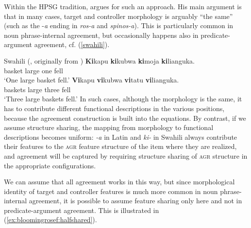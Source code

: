 \documentclass[output=paper,hidelinks]{langscibook}
\begin{document}
Within the HPSG tradition, \textcite{Kathol:Agreement} argues for such
an approach. His main argument is that in many cases, target and
controller morphology is arguably ``the same'' (such as the
-\textit{a} ending in \textit{ros-a} and \textit{spinos-a}). This is
particularly common in noun phrase-internal agreement, but
occasionally happens also in predicate-argument agreement, cf. (\ref{swahili}).

\ea\label{swahili}Swahili (\citealt[ex. 14]{Kathol:Agreement}, originally from \citealt[171]{Welmers1973})
\ea\label{swahili1}
\gll\textbf{Ki}kapu \textbf{ki}kubwa \textbf{ki}moja \textbf{ki}lianguka.\\
basket large one fell\\
\glt`One large basket fell.'
\ex\label{swahili2}
\gll\textbf{Vi}kapu \textbf{vi}kubwa \textbf{vi}tatu \textbf{vi}lianguka.\\
baskets large three fell\\
\glt`Three large baskets fell.'
\z\z
%
In such cases, although the morphology is the same, it has to
contribute different functional descriptions in the various positions, because the agreement
construction is built into the equations. By contrast, if we assume
structure sharing, the mapping from morphology to functional
descriptions becomes uniform: \textit{-a} in Latin and
\textit{ki-} in Swahili always contribute their features to the
\textsc{agr} feature structure of the item where they are realized,
and agreement will be captured by requiring structure sharing of
\textsc{agr} structure in the appropriate configurations.

We can assume that all agreement works in this way, but since
morphological identity of target and controller features is much more
common in noun phrase-internal agreement, it is possible to assume
feature sharing only here and not in predicate-argument agreement. This is
illustrated in (\ref{ex:bloomingrosef:halfshared}).
\end{document}
